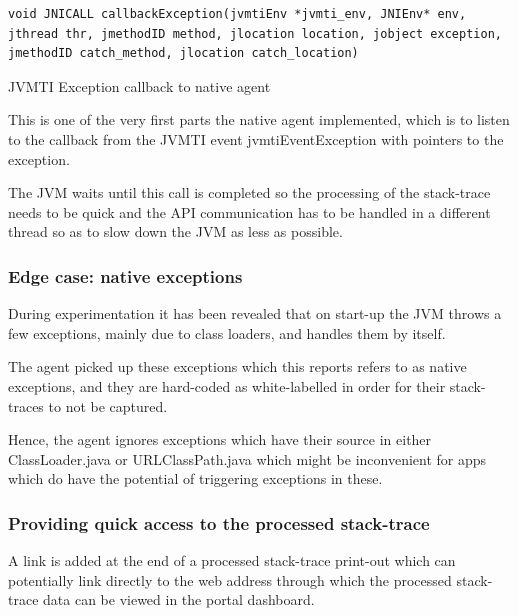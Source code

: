 \begin{listing}[H]
\begin{verbatim}
void JNICALL callbackException(jvmtiEnv *jvmti_env, JNIEnv* env, jthread thr, jmethodID method, jlocation location, jobject exception, jmethodID catch_method, jlocation catch_location)
\end{verbatim}
\caption{JVMTI Exception callback to native agent}
\end{listing}


This is one of the very first parts the native agent implemented, which is to listen to the callback from the JVMTI event jvmtiEventException with pointers to the exception. 

The JVM waits until this call is completed so the processing of the stack-trace needs to be quick and the API communication has to be handled in a different thread so as to slow down the JVM as less as possible.

\subsubsection{Edge case: native exceptions}
During experimentation it has been revealed that on start-up the JVM throws a few exceptions, mainly due to class loaders, and handles them by itself.

The agent picked up these exceptions which this reports refers to as native exceptions, and they are hard-coded as white-labelled in order for their stack-traces to not be captured.

Hence, the agent ignores exceptions which have their source in either ClassLoader.java or URLClassPath.java which might be inconvenient for apps which do have the potential of triggering exceptions in these.

\subsubsection{Providing quick access to the processed stack-trace}

A link is added at the end of a processed stack-trace print-out which can potentially link directly to the web address through which the processed stack-trace data can be viewed in the portal dashboard.

